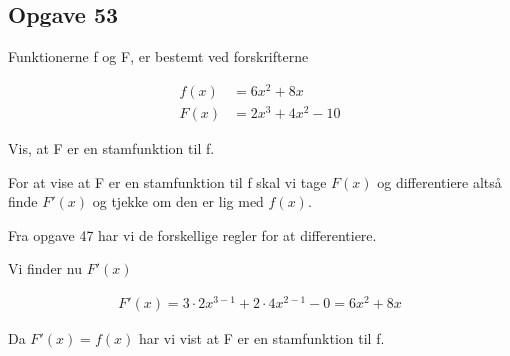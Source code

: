 \subsection{Opgave 53}

Funktionerne f og F, er bestemt ved forskrifterne

\begin{align*}
    f(x) &= 6x^2 + 8x\\
    F(x) &= 2x^3 + 4x^2 - 10
\end{align*}

Vis, at F er en stamfunktion til f.

\ans

For at vise at F er en stamfunktion til f skal vi tage $F(x)$ og differentiere altså finde $F'(x)$ og tjekke
om den er lig med $f(x)$.

Fra opgave 47 har vi de forskellige regler for at differentiere.

Vi finder nu $F'(x)$

\begin{align*}
    F'(x) = 3\cdot 2x^{3-1} + 2\cdot 4x^{2-1} - 0 = 6x^2 + 8x
\end{align*}

Da $F'(x) = f(x)$ har vi vist at F er en stamfunktion til f.

